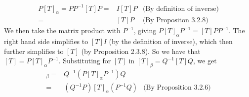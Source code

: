 \documentclass[12pt]{article}
\newenvironment{problem}[2][Problem]
{
	\begin{trivlist} 
		\item[\hskip \labelsep {\bfseries #1 #2:}]
	}
{
	\end{trivlist}
	}
\newenvironment{solution}[1][Solution]
{
	\begin{trivlist} 
		\item[\hskip \labelsep {\itshape #1:}]
	}
	{
	\end{trivlist}
}
\begin{document}
\begin{problem}{2}
\begin{solution}
\begin{align*}
P [T]_{\alpha} = P P^{-1} [T] P =& I [T] P &\text{(By definition of inverse)} \\
=&[T] P & \text{(By Propositon 3.2.8)}
\end{align*}
We then take the matrix product with $P^{-1}$, giving $P [T]_{\alpha} P^{-1} = [T] P P^{-1}$. The right hand side simplifies to $[T] I$ (by the definition of inverse), which then further simplifies to  $[T]$ (by Proposition 2.3.8). So we have that $[T] = P [T]_{\alpha} P^{-1}$. Substituting for $[T]$ in $[T]_{\beta} = Q^{-1} [T] Q$, we get
\begin{align*}
[T]_{\beta} =& Q^{-1} (P [T]_{\alpha} P^{-1}) Q &\\
=& (Q^{-1} P) [T]_{\alpha} (P^{-1} Q) & \text{(By Proposition 3.2.6)}
\end{align*}

\end{solution}
\end{problem}
\end{document}
